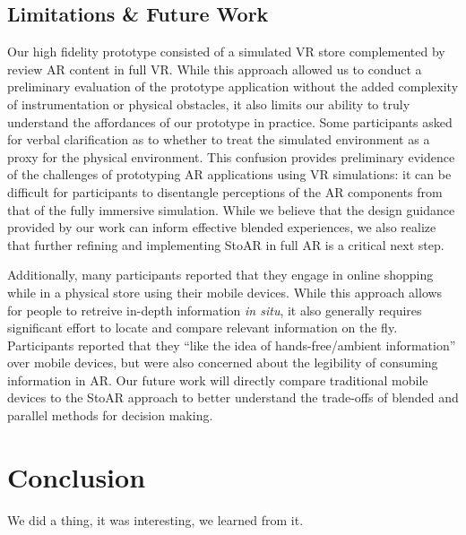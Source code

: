 \subsection{Limitations \& Future Work}
Our high fidelity prototype consisted of a simulated VR store complemented by review AR content in full VR.  While this approach allowed us to conduct a preliminary evaluation of the prototype application without the added complexity of instrumentation or physical obstacles, it also limits our ability to truly understand the affordances of our prototype in practice.  Some participants asked for verbal clarification as to whether to treat the simulated environment as a proxy for the physical environment. This confusion provides preliminary evidence of the challenges of prototyping AR applications using VR simulations: it can be difficult for participants to disentangle perceptions of the AR components from that of the fully immersive simulation. While we believe that the design guidance provided by our work can inform effective blended experiences, we also realize that further refining and implementing StoAR in full AR is a critical next step. 

Additionally, many participants reported that they engage in online shopping while in a physical store using their mobile devices. While this approach allows for people to retreive in-depth information \emph{in situ}, it also generally requires significant effort to locate and compare relevant information on the fly. Participants reported that they
``like the idea of hands-free/ambient information'' over mobile devices, but were also concerned about the legibility of consuming information in AR. Our future work will directly compare traditional mobile devices to the StoAR approach to better understand the trade-offs of blended and parallel methods for decision making. 

\section{Conclusion}
We did a thing, it was interesting, we learned from it.